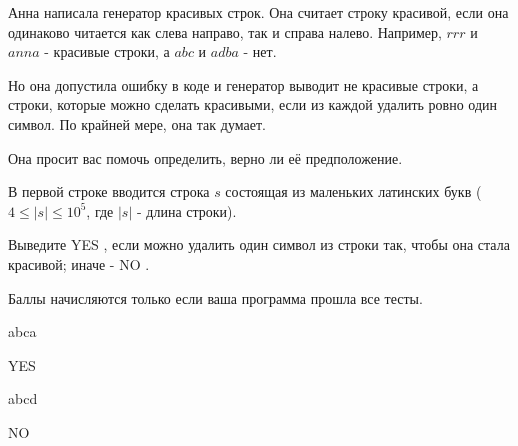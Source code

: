 
Анна написала генератор красивых строк. Она считает строку красивой, если она одинаково читается 
как слева направо, так и справа налево. Например, $rrr$ и $anna$ - красивые строки, а 
$abc$ и $adba$ - нет.

Но она допустила ошибку в коде и генератор выводит не красивые строки, а строки, которые можно 
сделать красивыми, если из каждой удалить ровно один символ. По крайней мере, она так думает.

Она просит вас помочь определить, верно ли её предположение.


В первой строке вводится строка $s$ состоящая из маленьких латинских букв ($4 \le |s| \le 10^5$, где $|s|$ - длина строки).

\outputfmtSection

Выведите YES , если можно удалить один символ из строки так, чтобы она стала красивой; иначе - NO .

\markSection

Баллы начисляются только если ваша программа прошла все тесты.


\begin{myverbbox}[\small]{\vinput}
    abca
\end{myverbbox}
\begin{myverbbox}[\small]{\voutput}
    YES
\end{myverbbox}


\begin{myverbbox}[\small]{\vinput}
    abcd
\end{myverbbox}
\begin{myverbbox}[\small]{\voutput}
    NO
\end{myverbbox}

